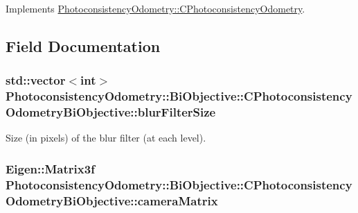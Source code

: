 Implements \hyperlink{class_photoconsistency_odometry_1_1_c_photoconsistency_odometry_ac22e57f7f5039b7988447e7bd7d77f89}{PhotoconsistencyOdometry::CPhotoconsistencyOdometry}.



\subsection{Field Documentation}
\hypertarget{class_photoconsistency_odometry_1_1_bi_objective_1_1_c_photoconsistency_odometry_bi_objective_a3eb4895b36bfd0bb7c1b19bff7e85694}{
\subsubsection[{blurFilterSize}]{\setlength{\rightskip}{0pt plus 5cm}std::vector$<$int$>$ {\bf PhotoconsistencyOdometry::BiObjective::CPhotoconsistencyOdometryBiObjective::blurFilterSize}}}
\label{class_photoconsistency_odometry_1_1_bi_objective_1_1_c_photoconsistency_odometry_bi_objective_a3eb4895b36bfd0bb7c1b19bff7e85694}
Size (in pixels) of the blur filter (at each level). \hypertarget{class_photoconsistency_odometry_1_1_bi_objective_1_1_c_photoconsistency_odometry_bi_objective_a74d4c192feef1afef8a8d8e2a0355899}{
\subsubsection[{cameraMatrix}]{\setlength{\rightskip}{0pt plus 5cm}Eigen::Matrix3f {\bf PhotoconsistencyOdometry::BiObjective::CPhotoconsistencyOdometryBiObjective::cameraMatrix}}}
\label{class_photoconsistency_odometry_1_1_bi_objective_1_1_c_photoconsistency_odometry_bi_objective_a74d4c192feef1afef8a8d8e2a0355899}
